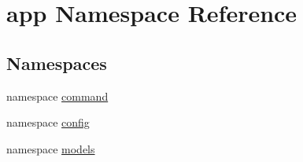 \hypertarget{namespaceapp}{\section{app Namespace Reference}
\label{namespaceapp}
}
\subsection*{Namespaces}
\begin{DoxyCompactItemize}
\item 
namespace \hyperlink{namespaceapp_1_1command}{command}
\item 
namespace \hyperlink{namespaceapp_1_1config}{config}
\item 
namespace \hyperlink{namespaceapp_1_1models}{models}
\end{DoxyCompactItemize}
